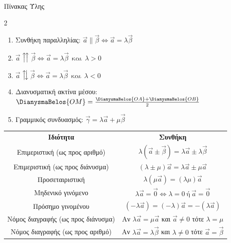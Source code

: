 \documentclass[twoside,nofonts,internet,math,spyros]{frontisthrio}
\begin{document}
\begin{mybox}[mysubtitle]{Πίνακας Ύλης}
\begin{multicols}{2}
\begin{enumerate}[itemsep=0mm,leftmargin=4mm]
\item Συνθήκη παραλληλίας: $\vec{a}\parallel\vec{\beta}\Leftrightarrow \vec{a}=\lambda\vec{\beta}$
\item $\vec{a}\upuparrows\vec{\beta}\Leftrightarrow \vec{a}=\lambda\vec{\beta}\ \ \textrm{και}\ \ \lambda>0$
\item $\vec{a}\updownarrows\vec{\beta}\Leftrightarrow \vec{a}=\lambda\vec{\beta}\ \ \textrm{και}\ \ \lambda<0$
\item Διανυσματική ακτίνα μέσου: $\DianysmaBelos{OM}=\frac{\DianysmaBelos{OA}+\DianysmaBelos{OB}}{2}$
\item Γραμμικός συνδυασμός: $\vec{\gamma}=\lambda\vec{a}+\mu\vec{\beta}$
\end{enumerate}
\end{multicols}
\begin{center}
\begin{longtable}{cc}
\hline \rule[-2ex]{0pt}{5ex} \textbf{Ιδιότητα} & \textbf{Συνθήκη} \\ 
\hhline{==} \rule[-2ex]{0pt}{5ex} Επιμεριστική (ως προς αριθμό) & $ \lambda\left( \vec{a}\pm\vec{\beta}\right)=\lambda\vec{a}\pm\lambda\vec{\beta} $ \\ 
\rule[-2ex]{0pt}{4.5ex} Επιμεριστική (ως προς διάνυσμα) & $ \left( \lambda\pm\mu\right)\vec{a}=\lambda\vec{a}\pm\mu\vec{a} $ \\
\rule[-2ex]{0pt}{4ex} Προσεταιριστική & $ \lambda\left( \mu\vec{a}\right)=\left( \lambda\mu\right)\vec{a} $ \\ 
\rule[-2ex]{0pt}{4ex} Μηδενικό γινόμενο & $ \lambda\vec{a}=\vec{0}\Leftrightarrow \lambda=0 \ \textrm{ή}\ \vec{a}=\vec{0} $ \\ 
\rule[-2ex]{0pt}{4ex} Πρόσημο γινομένου & $ \left( -\lambda\vec{a}\right)=(-\lambda)\vec{a}=-\left( \lambda\vec{a}\right)  $ \\ 
\rule[-2ex]{0pt}{4ex} Νόμος διαγραφής (ως προς διάνυσμα) & Αν $ \lambda\vec{a}=\mu\vec{a} $ και $ \vec{a}\neq0 $ τότε $ \lambda=\mu $ \\ 
\rule[-2ex]{0pt}{4ex} Νόμος διαγραφής (ως προς αριθμό) & Αν $ \lambda\vec{a}=\lambda\vec{\beta} $ και $ \lambda\neq0 $ τότε $ \vec{a}=\vec{\beta} $\\ 
\hline 
\end{longtable}
\end{center} 
\end{mybox}

\newpage
\end{document}
